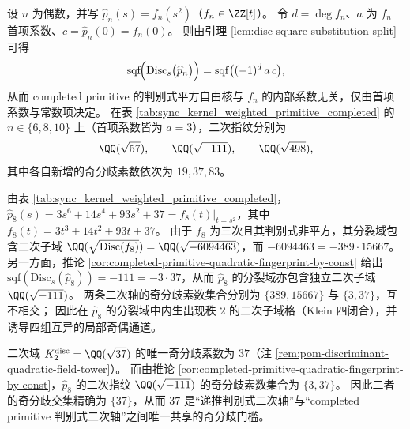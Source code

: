 \begin{corollary}\label{cor:completed-primitive-quadratic-fingerprint-by-const}
设 \(n\) 为偶数，并写 \(\widehat p_n(s)=f_n(s^2)\)（\(f_n\in\ZZ[t]\)）。
令 \(d=\deg f_n\)、\(a\) 为 \(f_n\) 首项系数、\(c=\widehat p_n(0)=f_n(0)\)。
则由引理 \ref{lem:disc-square-substitution-split} 可得
\[
\mathrm{sqf}\!\Bigl(\mathrm{Disc}_s\bigl(\widehat p_n\bigr)\Bigr)
=\mathrm{sqf}\bigl((-1)^d\,a\,c\bigr),
\]
从而 completed primitive 的判别式平方自由核与 \(f_n\) 的内部系数无关，仅由首项系数与常数项决定。
在表 \ref{tab:sync_kernel_weighted_primitive_completed} 的 \(n\in\{6,8,10\}\) 上（首项系数皆为 \(a=3\)），二次指纹分别为
\[
\QQ(\sqrt{57}),\qquad \QQ(\sqrt{-111}),\qquad \QQ(\sqrt{498}),
\]
其中各自新增的奇分歧素数依次为 \(19,37,83\)。
\end{corollary}

\begin{remark}\label{rem:hatp8-klein-four-quadratic-axes}
由表 \ref{tab:sync_kernel_weighted_primitive_completed}，
\(\widehat p_8(s)=3s^6+14s^4+93s^2+37=f_8(t)|_{t=s^2}\)，其中
\(
f_8(t)=3t^3+14t^2+93t+37
\)。
由于 \(f_8\) 为三次且其判别式非平方，其分裂域包含二次子域 \(\QQ(\sqrt{\mathrm{Disc}(f_8)})=\QQ(\sqrt{-6094463})\)，而
\(-6094463=-389\cdot 15667\)。
另一方面，推论 \ref{cor:completed-primitive-quadratic-fingerprint-by-const} 给出 \(\mathrm{sqf}(\mathrm{Disc}_s(\widehat p_8))=-111=-3\cdot 37\)，从而 \(\widehat p_8\) 的分裂域亦包含独立二次子域 \(\QQ(\sqrt{-111})\)。
两条二次轴的奇分歧素数集合分别为 \(\{389,15667\}\) 与 \(\{3,37\}\)，互不相交；
因此在 \(\widehat p_8\) 的分裂域中内生出现秩 \(2\) 的二次子域格（Klein 四闭合），并诱导四组互异的局部奇偶通道。
\end{remark}

\begin{corollary}\label{cor:disc2-prim8-shared-ramified-37}
二次域 \(K_2^{\mathrm{disc}}=\QQ(\sqrt{37})\) 的唯一奇分歧素数为 \(37\)（注 \ref{rem:pom-discriminant-quadratic-field-tower}）。
而由推论 \ref{cor:completed-primitive-quadratic-fingerprint-by-const}，\(\widehat p_8\) 的二次指纹 \(\QQ(\sqrt{-111})\) 的奇分歧素数集合为 \(\{3,37\}\)。
因此二者的奇分歧交集精确为 \(\{37\}\)，从而 \(37\) 是“递推判别式二次轴”与“completed primitive 判别式二次轴”之间唯一共享的奇分歧门槛。
\end{corollary}


